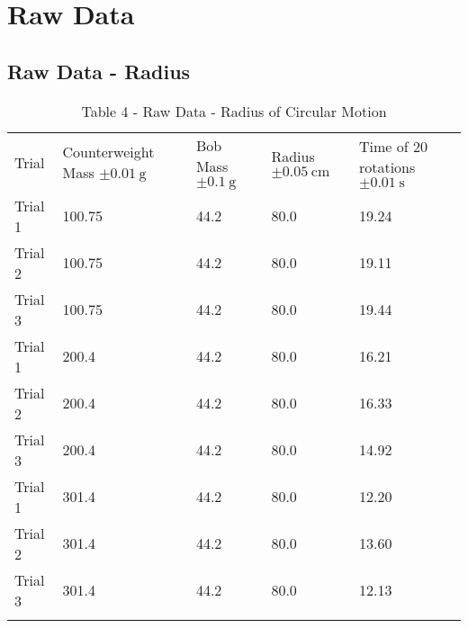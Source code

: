 \documentclass{lab}
\begin{document}
	\section{Raw Data}
	\noindent\begin{minipage}{\textwidth}
    \subsection{Raw Data - Radius}
    \vspace{-0.2cm}
	\renewcommand{\arraystretch}{1.1}
        \begin{table}[H]
            \centering
            \begin{tabular}{l|llll}
		    	\dtoprule
				Trial		& Counterweight Mass $\pm \SI{0.01}{\gram}$		& Bob Mass $\pm \SI{0.1}{\gram}$		& Radius $\pm \SI{0.05}{\cm}$		& Time of 20 rotations $\pm \SI{0.01}{\second}$	\\
				Trial 1		& 100.75										& 44.2									& 80.0								& 19.24											\\
				Trial 2		& 100.75										& 44.2									& 80.0								& 19.11											\\
				Trial 3		& 100.75										& 44.2									& 80.0								& 19.44											\\
				\hline
				Trial 1		& 200.4											& 44.2									& 80.0								& 16.21											\\
				Trial 2		& 200.4											& 44.2									& 80.0								& 16.33											\\
				Trial 3		& 200.4											& 44.2									& 80.0								& 14.92											\\
				\hline
				Trial 1		& 301.4											& 44.2									& 80.0								& 12.20											\\
				Trial 2		& 301.4											& 44.2									& 80.0								& 13.60											\\
				Trial 3		& 301.4											& 44.2									& 80.0								& 12.13											\\
	    	    \dbottomrule
	    \end{tabular}
	    \caption{Table 4 - Raw Data - Radius of Circular Motion}
	    \label{table: raw-data1}
	\end{table}
	\end{minipage}
\end{document}
